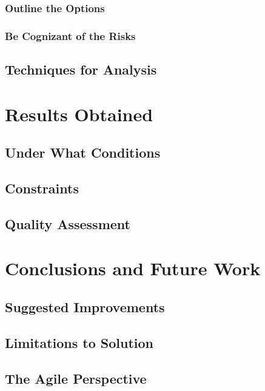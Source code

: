 \documentclass[a4paper,12pt]{report}
\begin{document}
\subsection{Outline the Options}
\subsection{Be Cognizant of the Risks}
\section{Techniques for Analysis}

\chapter{Results Obtained}
\section{Under What Conditions}
\section{Constraints}
\section{Quality Assessment}

\chapter{Conclusions and Future Work}
\section{Suggested Improvements}
\section{Limitations to Solution}
\section{The Agile Perspective}
\end{document}

